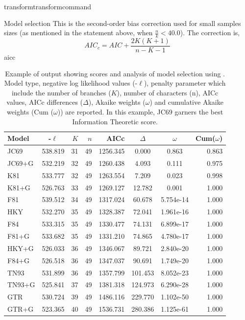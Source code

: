 \begin{command}{transform}{transformcommand}
\begin{arguments}
\begin {argumentgroup}{Model selection}
{This is the second-order bias correction used for small
samples sizes (as mentioned in the statement above, when
$\frac{n}{k} < 40.0$). The correction is,
\begin{equation*}
AIC_c = AIC + \frac{2K(K+1)} {n-K-1}
\end{equation*}}
{aicc}
\begin{table}[t]
\small
\caption{Example of \poy output showing scores and analysis of model 
selection using . Model type, negative log likelihood 
values (-$\ell$), penalty parameter which include the number of branches
($K$), number of characters (n), AICc values, AICc differences (${\Delta}$), 
Akaike weights (${\omega}$) and cumulative Akaike weights (Cum (${\omega}$)) are reported.
In this example, JC69 garners the best Information Theoretic score. }
\label {ModelSelectionReport}
\begin{center}
\begin{tabular}{ l c r r r c c r }
\hline
Model &-$\ell$ & $K$ & $n$ & AICc  & ${\Delta}$ &${\omega}$ & Cum(${\omega}$)\\
\hline
JC69 &538.819&31&49&1256.345& 0.000&0.863  &0.863 \\
JC69+G&532.219&32&49&1260.438& 4.093&0.111  &0.975 \\
K81  &533.777&32&49&1263.554& 7.209&0.023  &0.998 \\
K81+G &526.763&33&49&1269.127& 12.782&0.001  &1.000 \\
F81  &539.512&34&49&1317.024& 60.678&5.754e-14&1.000 \\
HKY  &532.270&35&49&1328.387& 72.041&1.961e-16&1.000 \\
F84  &533.315&35&49&1330.477& 74.131&6.899e-17&1.000 \\
F81+G &533.682&35&49&1331.210& 74.865&4.780e-17&1.000 \\
HKY+G &526.033&36&49&1346.067& 89.721&2.840e-20&1.000 \\
F84+G &526.518&36&49&1347.037& 90.691&1.749e-20&1.000 \\
TN93 &531.899&36&49&1357.799&101.453&8.052e-23&1.000 \\
TN93+G&525.841&37&49&1381.318&124.973&6.290e-28&1.000 \\
GTR  &530.724&39&49&1486.116&229.770&1.102e-50&1.000 \\
GTR+G &523.365&40&49&1536.731&280.386&1.125e-61&1.000 \\
\hline
\end{tabular}
\end{center}
\end{table}


\end{argumentgroup}
\end{arguments}
\end{command}
